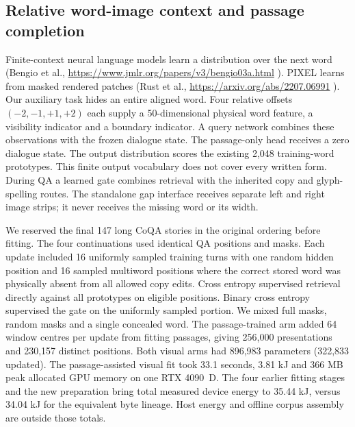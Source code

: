 \documentclass[12pt,a4paper]{article}
\providecommand{\DIFadd}[1]{{\protect\color{blue} \sf #1}} %
\begin{document}
\subsection*{\DIFadd{Relative word-image context and passage completion}}
\DIFadd{Finite-context neural language models learn a distribution over the next word (Bengio et al., }\url{https://www.jmlr.org/papers/v3/bengio03a.html}\DIFadd{). PIXEL learns from masked rendered patches (Rust et al., }\url{https://arxiv.org/abs/2207.06991}\DIFadd{). Our auxiliary task hides an entire aligned word. Four relative offsets $(-2,-1,+1,+2)$ each supply a 50-dimensional physical word feature, a visibility indicator and a boundary indicator. A query network combines these observations with the frozen dialogue state. The passage-only head receives a zero dialogue state. The output distribution scores the existing 2,048 training-word prototypes. This finite output vocabulary does not cover every written form. During QA a learned gate combines retrieval with the inherited copy and glyph-spelling routes. The standalone gap interface receives separate left and right image strips; it never receives the missing word or its width.
}

\DIFadd{We reserved the final 147 long CoQA stories in the original ordering before fitting. The four continuations used identical QA positions and masks. Each update included 16 uniformly sampled training turns with one random hidden position and 16 sampled multiword positions where the correct stored word was physically absent from all allowed copy edits. Cross entropy supervised retrieval directly against all prototypes on eligible positions. Binary cross entropy supervised the gate on the uniformly sampled portion. We mixed full masks, random masks and a single concealed word. The passage-trained arm added 64 window centres per update from fitting passages, giving 256,000 presentations and 230,157 distinct positions. Both visual arms had 896,983 parameters (322,833 updated). The passage-assisted visual fit took 33.1 seconds, 3.81 kJ and 366 MB peak allocated GPU memory on one RTX 4090~D. The four earlier fitting stages and the new preparation bring total measured device energy to 35.44 kJ, versus 34.04 kJ for the equivalent byte lineage. Host energy and offline corpus assembly are outside those totals.
}
\end{document}

